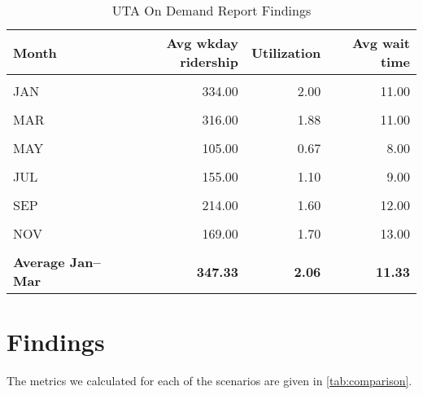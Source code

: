 \documentclass[3p, authoryear]{elsarticle} %
\begin{document}
\begin{table}[H]

\caption{\label{tab:UTAOD}UTA On Demand Report Findings}
\centering
\begin{tabular}[t]{lrrr}
\toprule
Month & Avg wkday ridership & Utilization & Avg wait time\\
\midrule
\cellcolor{gray!6}{DEC} & \cellcolor{gray!6}{224.00} & \cellcolor{gray!6}{1.33} & \cellcolor{gray!6}{9.00}\\
JAN & 334.00 & 2.00 & 11.00\\
\cellcolor{gray!6}{FEB} & \cellcolor{gray!6}{392.00} & \cellcolor{gray!6}{2.31} & \cellcolor{gray!6}{12.00}\\
MAR & 316.00 & 1.88 & 11.00\\
\cellcolor{gray!6}{APR} & \cellcolor{gray!6}{275.00} & \cellcolor{gray!6}{1.52} & \cellcolor{gray!6}{10.00}\\
MAY & 105.00 & 0.67 & 8.00\\
\cellcolor{gray!6}{JUN} & \cellcolor{gray!6}{162.00} & \cellcolor{gray!6}{1.10} & \cellcolor{gray!6}{9.00}\\
JUL & 155.00 & 1.10 & 9.00\\
\cellcolor{gray!6}{AUG} & \cellcolor{gray!6}{193.00} & \cellcolor{gray!6}{1.50} & \cellcolor{gray!6}{12.00}\\
SEP & 214.00 & 1.60 & 12.00\\
\cellcolor{gray!6}{OCT} & \cellcolor{gray!6}{200.00} & \cellcolor{gray!6}{1.70} & \cellcolor{gray!6}{13.00}\\
NOV & 169.00 & 1.70 & 13.00\\
\textbf{\cellcolor{gray!6}{Average}} & \textbf{\cellcolor{gray!6}{228.25}} & \textbf{\cellcolor{gray!6}{1.53}} & \textbf{\cellcolor{gray!6}{10.75}}\\
\textbf{Average Jan--Mar} & \textbf{347.33} & \textbf{2.06} & \textbf{11.33}\\
\bottomrule
\end{tabular}
\end{table}

\hypertarget{findings}{%
\section{Findings}\label{findings}}

The metrics we calculated for each of the scenarios are given in \ref{tab:comparison}.
\end{document}
